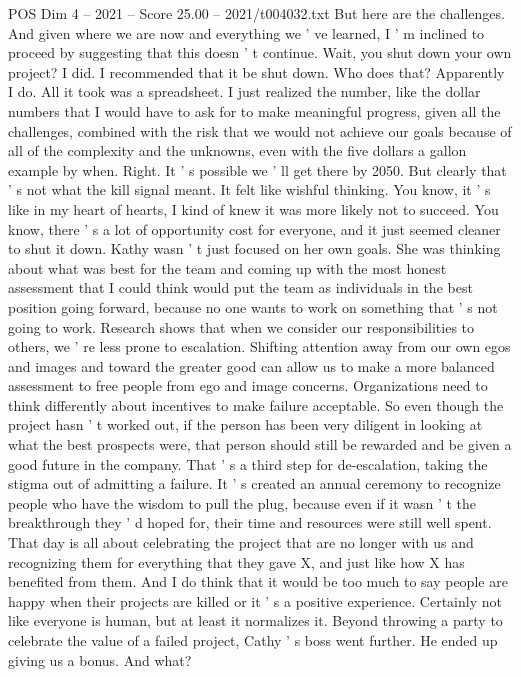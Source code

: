 \begin{textsample}{POS Dim 4 – 2021 – Score 25.00 – 2021/t004032.txt}
But here are the challenges.
And given where we are now and everything we ' ve learned, I ' m inclined to proceed by suggesting that this doesn ' t continue.
Wait, you shut down your own project?
I did.
I recommended that it be shut down.
Who does that?
Apparently I do.
All it took was a spreadsheet.
I just realized the number, like the dollar numbers that I would have to ask for to make meaningful progress, given all the challenges, combined with the risk that we would not achieve our goals because of all of the complexity and the unknowns, even with the five dollars a gallon example by when.
Right.
It ' s possible we ' ll get there by 2050.
But clearly that ' s not what the kill signal meant.
It felt like wishful thinking.
You know, it ' s like in my heart of hearts, I kind of knew it was more likely not to succeed.
You know, there ' s a lot of opportunity cost for everyone, and it just seemed cleaner to shut it down.
Kathy wasn ' t just focused on her own goals.
She was thinking about what was best for the team and coming up with the most honest assessment that I could think would put the team as individuals in the best position going forward, because no one wants to work on something that ' s not going to work.
Research shows that when we consider our responsibilities to others, we ' re less prone to escalation.
Shifting attention away from our own egos and images and toward the greater good can allow us to make a more balanced assessment to free people from ego and image concerns.
Organizations need to think differently about incentives to make failure acceptable.
So even though the project hasn ' t worked out, if the person has been very diligent in looking at what the best prospects were, that person should still be rewarded and be given a good future in the company.
That ' s a third step for de-escalation, taking the stigma out of admitting a failure.
It ' s created an annual ceremony to recognize people who have the wisdom to pull the plug, because even if it wasn ' t the breakthrough they ' d hoped for, their time and resources were still well spent.
That day is all about celebrating the project that are no longer with us and recognizing them for everything that they gave X, and just like how X has benefited from them.
And I do think that it would be too much to say people are happy when their projects are killed or it ' s a positive experience.
Certainly not like everyone is human, but at least it normalizes it.
Beyond throwing a party to celebrate the value of a failed project, Cathy ' s boss went further.
He ended up giving us a bonus.
And what?

\end{textsample}
